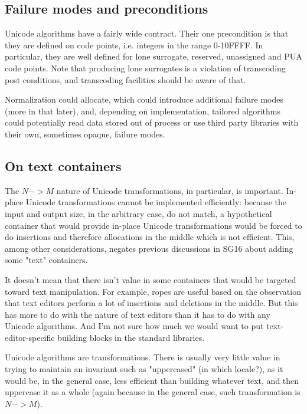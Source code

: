 \documentclass{wg21}
\begin{document}
\subsection{Failure modes and preconditions}

Unicode algorithms have a fairly wide contract.
Their one precondition is that they are defined on code points, i.e. integers in the range 0-10FFFF.
In particular, they are well defined for lone surrogate, reserved, unassigned and PUA code points.
Note that producing lone surrogates is a violation of transcoding post conditions, and transcoding facilities should be aware of that.

Normalization could allocate, which could introduce additional failure modes
(more in that later), and, depending on implementation, tailored algorithms could potentially read data stored out of process or use third party libraries with their own, sometimes opaque, failure modes.

\subsection{On text containers}

The $N->M$ nature of Unicode transformations, in particular, is important. In-place Unicode transformations cannot be implemented efficiently: because the input and output size, in the arbitrary case, do not match, a hypothetical container that would provide in-place Unicode transformations would be forced to do insertions and therefore allocations in the middle which is not efficient. This, among other considerations, negates previous discussions in SG16 about adding some "text" containers.

It doesn't mean that there isn't value in some containers that would be targeted toward text manipulation. For example, ropes are useful based on the observation that text editors perform a lot of insertions and deletions in the middle. But this has more to do with the nature of text editors than it has to do with any Unicode algorithms. And I'm not sure how much we would want to put text-editor-specific building blocks in the standard libraries.

Unicode algorithms are transformations. There is usually very little value in trying to maintain an invariant such as "uppercased" (in which locale?), as it would be, in the general case, less efficient than building whatever text, and then uppercase it as a whole (again because in the general case, such transformation is $N->M$).
\end{document}
